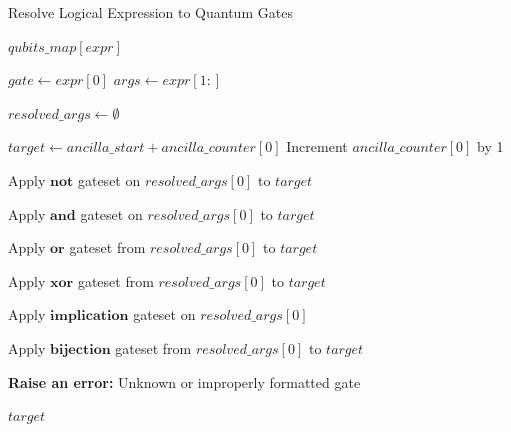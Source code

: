 \documentclass[encoding=utf8,british]{tumphthesis}
\begin{document}
    \begin{algorithm}[H]
    \caption{Resolve Logical Expression to Quantum Gates}
    \label{alg:ResolveExpression}
    \begin{algorithmic}[2]
            \State \Return $qubits\_map[expr]$
        \EndIf

            \State $gate \gets expr[0]$ 
            \State $args \gets expr[1:]$
            
            \State $resolved\_args \gets \emptyset$
            
            \State $target \gets ancilla\_start + ancilla\_counter[0]$
            \State Increment $ancilla\_counter[0]$ by 1
            
                \State Apply $\mathbf{not}$ gateset on $resolved\_args[0]$ to $target$
            
                \State Apply $\mathbf{and}$ gateset on $resolved\_args[0]$ to $target$
            
                \State Apply $\mathbf{or}$ gateset from $resolved\_args[0]$ to $target$
            
                \State Apply $\mathbf{xor}$ gateset from $resolved\_args[0]$ to $target$
            
                \State Apply $\mathbf{implication}$ gateset on $resolved\_args[0]$
            
                \State Apply $\mathbf{bijection}$ gateset from $resolved\_args[0]$ to $target$
            
            \Else
                \State \textbf{Raise an error:} Unknown or improperly formatted gate
            \EndIf
            
            \State \Return $target$
        \EndIf
    \EndFunction
    \end{algorithmic}
    \end{algorithm}
\end{document}
